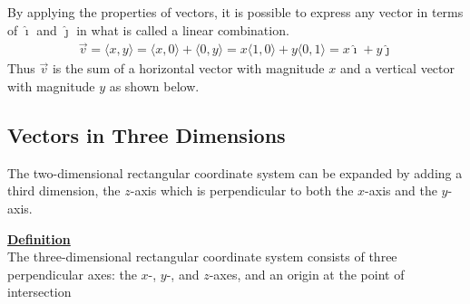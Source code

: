 \documentclass[a4paper]{article}
\let\bf\textbf
\let\la\langle
\let\ra\rangle
\newcommand{\ih}{\hat{\imath}}
\newcommand{\jh}{\hat{\jmath}}
\begin{document}
\begin{center}
\end{center}
By applying the properties of vectors, it is possible to express any vector in terms of $\ih$ and $\jh$ in what is called a linear combination.
\begin{align*}
    \vec{v} = \la x, y \ra = \la x, 0 \ra + \la 0, y \ra = x\la 1, 0 \ra + y\la 0, 1 \ra = x\ih + y\jh
\end{align*}
Thus $\vec{v}$ is the sum of a horizontal vector with magnitude $x$ and a vertical vector with magnitude $y$ as shown below.
\begin{center}
\end{center}

\newpage
\subsection{Vectors in Three Dimensions}
The two-dimensional rectangular coordinate system can be expanded by adding a third dimension, the $z$-axis which is perpendicular to both the $x$-axis and the $y$-axis.
\begin{shaded}
    \noindent\underline{\bf{Definition}}
    \vspace{2mm}\\
    The three-dimensional rectangular coordinate system consists of three perpendicular axes: the $x$-, $y$-, and $z$-axes, and an origin at the point of intersection
\end{shaded}
\end{document}
